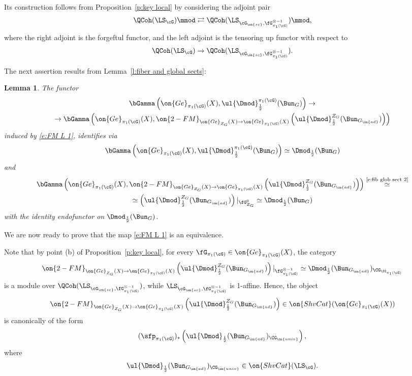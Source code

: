 \documentclass[9pt]{amsart}
\newtheorem{lem}[subsubsection]{Lemma}
\theoremstyle{remark}
\theoremstyle{definition}
\theoremstyle{remark}
\newcommand{\lemref}[1]{Lemma~\ref{#1}}
\newcommand{\propref}[1]{Proposition~\ref{#1}}
\numberwithin{equation}{section}
\begin{document}
Its construction follows from \propref{p:key local} by considering the adjoint pair
$$\QCoh(\LS_\cG)\mmod \rightleftarrows \QCoh(\LS_{\cG_{\on{sc}},\fG^{\otimes -1}_{\pi_1(\cG)}})\mmod,$$
where the right adjoint is the forgeftul functor, and the left adjoint is the tensoring up functor
with respect to
$$\QCoh(\LS_\cG)\to \QCoh(\LS_{\cG_{\on{sc}},\fG^{\otimes -1}_{\pi_1(\cG)}}).$$

\sssec{}

The next assertion results from \lemref{l:fiber and global sects}: 

\begin{lem} \label{l:L FM glob sect}
The functor
\begin{multline} \label{e:FM L glob}
\bGamma\left(\on{Ge}_{\pi_1(\cG)}(X),\ul{\Dmod}^{\pi_1(\cG)}_{\frac{1}{2}}(\Bun_G)\right)\to \\
\to \bGamma\left(\on{Ge}_{\pi_1(\cG)}(X),\on{2-FM}_{\on{Ge}_{Z_G}(X)\to \on{Ge}_{\pi_1(\cG)}(X)}\left(\ul{\Dmod}^{Z_G}_{\frac{1}{2}}(\Bun_{G_{\on{ad}}})\right)\right)
\end{multline}
induced by \eqref{e:FM L 1}, identifies via
$$\bGamma\left(\on{Ge}_{\pi_1(\cG)}(X),\ul{\Dmod}^{\pi_1(\cG)}_{\frac{1}{2}}(\Bun_G)\right) \simeq 
\Dmod_{\frac{1}{2}}(\Bun_G)$$
and
\begin{multline}
\bGamma\left(\on{Ge}_{\pi_1(\cG)}(X),\on{2-FM}_{\on{Ge}_{Z_G}(X)\to \on{Ge}_{\pi_1(\cG)}(X)}\left(\ul{\Dmod}^{Z_G}_{\frac{1}{2}}(\Bun_{G_{\on{ad}}})\right)\right)
\overset{\text{\eqref{e:fib glob sect 2}}}\simeq \\
\simeq \left(\ul{\Dmod}^{Z_G}_{\frac{1}{2}}(\Bun_{G_{\on{ad}}})\right)|_{\fG^0_{Z_G}}\simeq \Dmod_{\frac{1}{2}}(\Bun_G)
\end{multline}
with the identity endofunctor on $\Dmod_{\frac{1}{2}}(\Bun_G)$.
\end{lem}

\sssec{}

We are now ready to prove that the map \eqref{e:FM L 1} is an equivalence. 

\medskip

Note that by point (b) of \propref{p:key local}, for every $\fG_{\pi_1(\cG)}\in \on{Ge}_{\pi_1(\cG)}(X)$, 
the category 
$$\on{2-FM}_{\on{Ge}_{Z_G}(X)\to \on{Ge}_{\pi_1(\cG)}(X)}\left(\ul{\Dmod}^{Z_G}_{\frac{1}{2}}(\Bun_{G_{\on{ad}}})\right)|_{\fG^{\otimes -1}_{\pi_1(\cG)}}\simeq
\Dmod_{\frac{1}{2}}(\Bun_{G_{\on{ad}}})_{\CG_{\fG_{\pi_1(\cG)}}}$$
is a module 
over $\QCoh(\LS_{\cG_{\on{sc}},\fG^{\otimes -1}_{\pi_1(\cG)}})$, while $\LS_{\cG_{\on{sc}},\fG^{\otimes -1}_{\pi_1(\cG)}}$ is 1-affine. Hence, the object
$$\on{2-FM}_{\on{Ge}_{Z_G}(X)\to \on{Ge}_{\pi_1(\cG)}(X)}\left(\ul{\Dmod}^{Z_G}_{\frac{1}{2}}(\Bun_{G_{\on{ad}}})\right)\in 
\on{ShvCat}(\on{Ge}_{\pi_1(\cG)}(X))$$
is canonically of the form 
$$(\sfp_{\pi_1(\cG)})_*\left(\ul{\Dmod}_{\frac{1}{2}}(\Bun_{G_{\on{ad}}})_{\CG_{\on{univ}}}\right),$$
where 
$$\ul{\Dmod}_{\frac{1}{2}}(\Bun_{G_{\on{ad}}})_{\CG_{\on{univ}}}\in \on{ShvCat}(\LS_\cG).$$
\end{document}
